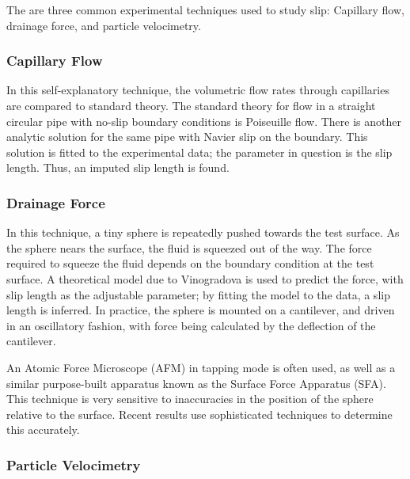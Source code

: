 \documentclass[12pt, a4paper, twoside, openright]{book}
\begin{document}

The are three common experimental techniques used to study slip: Capillary flow, drainage force, and particle velocimetry.

\subsubsection{Capillary Flow}

In this self-explanatory technique, the volumetric flow rates through capillaries are compared to standard theory.  The standard theory for flow in a straight circular pipe with no-slip boundary conditions is Poiseuille flow.  There is another analytic solution for the same pipe with Navier slip on the boundary. This solution is fitted to the experimental data; the parameter in question is the slip length.  Thus, an imputed slip length is found.

\subsubsection{Drainage Force}

In this technique, a tiny sphere is repeatedly pushed towards the test surface. As the sphere nears the surface, the fluid is squeezed out of the way.  The force required to squeeze the fluid depends on the boundary condition at the test surface.  A theoretical model due to Vinogradova \cite{Vinogradova1995} is used to predict the force, with slip length as the adjustable parameter; by fitting the model to the data, a slip length is inferred. In practice, the sphere is mounted on a cantilever, and driven in an oscillatory fashion, with force being calculated by the deflection of the cantilever.

An Atomic Force Microscope (AFM) in tapping mode is often used, as well as a similar purpose-built apparatus known as the Surface Force Apparatus (SFA).  This technique is very sensitive to inaccuracies in the position of the sphere relative to the surface.  Recent results use sophisticated techniques to determine this accurately.

\subsubsection{Particle Velocimetry}
\end{document}

